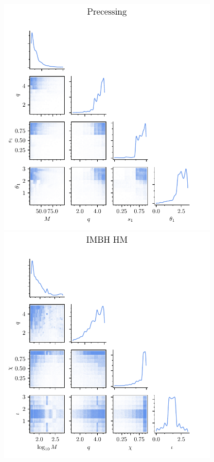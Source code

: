 \documentclass[twocolumn,showpacs,preprintnumbers,nofootinbib,prd,
superscriptaddress,10pt]{revtex4-2}
\begin{document}
\begin{figure}[t]
	\includegraphics[scale = 0.7]{bank_scatter_Precessing}\hfill
	\includegraphics[scale = 0.7]{bank_scatter_IMBH_HM}\hfill

\end{figure}
\end{document}
